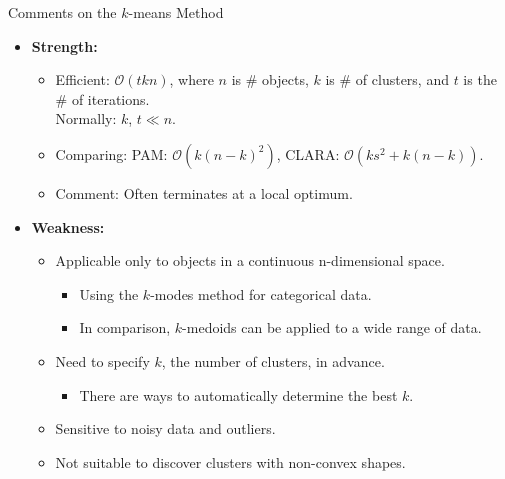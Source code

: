 \begin{frame}{Comments on the $k$-means Method}
	\begin{itemize}
		\item \textbf{Strength:}
		      \begin{itemize}
			      \item Efficient: $\mathcal{O}(tkn)$, where $n$ is $\#$ objects, $k$
			            is $\#$ of clusters, and $t$ is the $\#$ of iterations. \\
			            Normally: $k$, $t \ll n$.
			      \item Comparing: PAM: $\mathcal{O}(k(n-k)^2)$, CLARA:
			            $\mathcal{O}(ks^2 + k(n-k))$.
			      \item Comment: Often terminates at a local optimum.
		      \end{itemize}
		\item \textbf{Weakness:}
		      \begin{itemize}
			      \item Applicable only to objects in a continuous n-dimensional
			            space.
			            \begin{itemize}
				            \item Using the $k$-modes method for categorical data.
				            \item In comparison, $k$-medoids can be applied to a wide range
				                  of data.
			            \end{itemize}
			      \item Need to specify $k$, the number of clusters, in advance.
			            \begin{itemize}
				            \item There are ways to automatically determine the best $k$.
			            \end{itemize}
			      \item Sensitive to noisy data and outliers.
			      \item Not suitable to discover clusters with non-convex shapes.
		      \end{itemize}
	\end{itemize}
\end{frame}

